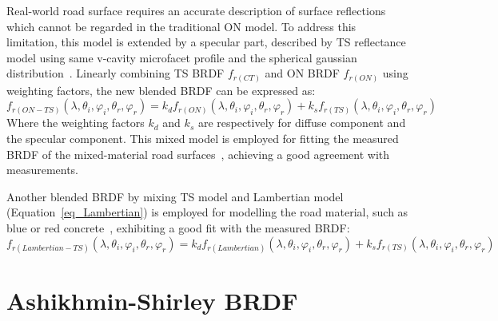 Real-world road surface requires an accurate description of surface reflections which cannot be regarded in the traditional ON model.
To address this limitation, this model is extended by a specular part, described by TS reflectance model using same v-cavity microfacet profile and the spherical gaussian distribution~\cite{1995_Oren,2000_Meister,2010_Roser}.
Linearly combining TS BRDF $f_{r(CT)}$ and ON BRDF $f_{r(ON)}$ using weighting factors, the new blended BRDF can be expressed as:
\begin{equation}
    \label{eq_brdf_mix_CT_ON}
    f_{r(ON-TS)}(\lambda, \theta_i, \varphi_i, \theta_r, \varphi_r) = k_d f_{r(ON)}(\lambda, \theta_i, \varphi_i, \theta_r, \varphi_r) + k_s f_{r(TS)}(\lambda, \theta_i, \varphi_i, \theta_r, \varphi_r)
\end{equation}
Where the weighting factors $k_d$ and $k_s$ are respectively for diffuse component and the specular component.
This mixed model is employed for fitting the measured BRDF of the mixed-material road surfaces~\cite{2000_Meister, 2010_Roser}, achieving a good agreement with measurements.

Another blended BRDF by mixing TS model and Lambertian model (Equation~\eqref{eq_Lambertian}) is employed for modelling the road material, such as blue or red concrete~\cite{2000_Meister}, exhibiting a good fit with the measured BRDF:
\begin{equation}
    \label{eq_brdf_mix_CT_Lambertian}
    f_{r(Lambertian-TS)}(\lambda, \theta_i, \varphi_i, \theta_r, \varphi_r) = k_d f_{r(Lambertian)}(\lambda, \theta_i, \varphi_i, \theta_r, \varphi_r) + k_s f_{r(TS)}(\lambda, \theta_i, \varphi_i, \theta_r, \varphi_r)
\end{equation}

\section{Ashikhmin-Shirley BRDF}

